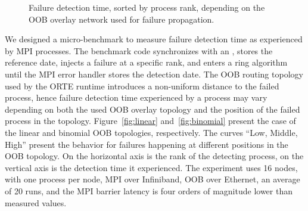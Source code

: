 \begin{figure}[htb]
\centering 
  \hfill
  \vspace{-.2cm}
\caption{Failure detection time, sorted by process rank, depending on the OOB overlay network used for 
failure propagation.}\label{fig:detect}
\end{figure}

We designed a micro-benchmark to measure failure detection time as
experienced by MPI processes. The benchmark code synchronizes with an
, stores the reference date, injects a failure at a specific
rank, and enters a ring algorithm until the MPI error handler stores the
detection date. The OOB routing topology used by the ORTE runtime introduces a
non-uniform distance to the failed process, hence failure detection time
experienced by a process may vary depending on both the used OOB 
overlay topology and the position of the failed
process in the topology. Figure~\ref{fig:linear}
and~\ref{fig:binomial} present the case of the linear and
binomial OOB topologies, respectively. The curves ``Low, Middle, High'' present the
behavior for failures happening at different positions in the OOB
topology. On the horizontal axis is the rank of the detecting process,
on the vertical axis is the detection time it experienced. The
experiment uses 16 nodes, with one process per node, MPI over Infiniband, OOB
over Ethernet, an average of 20 runs, and the MPI barrier latency is four orders of
magnitude lower than measured values.

